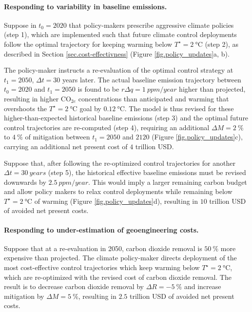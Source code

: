 \documentclass{article}
\begin{document}
\paragraph{Responding to variability in baseline emissions.}
Suppose in $t_{0} = 2020$ that policy-makers prescribe aggressive climate policies (step 1), which are implemented such that future climate control deployments follow the optimal trajectory for keeping warming below $T^{\star} = \SI{2}{\celsius}$ (step 2), as described in Section \ref{sec.cost-effectivness} (Figure \ref{fig.policy_updates}a, b). 

The policy-maker instructs a re-evaluation of the optimal control strategy at $t_{1} = 2050$, $\Delta t = 30$ years later. The actual baseline emission trajectory between $t_{0}=2020$ and $t_{1}=2050$ is found to be $r\Delta q = \SI{1}{ppm/year}$ higher than projected, resulting in higher CO$_{2e}$ concentrations than anticipated and warming that overshoots the $T^{\star} = \SI{2}{\celsius}$ goal by $\SI{0.12}{\celsius}$. The model is thus revised for these higher-than-expected historical baseline emissions (step 3) and the optimal future control trajectories are re-computed (step 4), requiring an additional $\Delta M = \SI{2}{\%}$ to $\SI{4}{\%}$ of mitigation between $t_{1} = 2050$ and $2120$ (Figure \ref{fig.policy_updates}c), carrying an additional net present cost of $4$ trillion USD.

Suppose that, after following the re-optimized control trajectories for another $\Delta t = \SI{30}{years}$ (step 5), the historical effective baseline emissions must be revised downwards by $\SI{2.5}{ppm/year}$. This would imply a larger remaining carbon budget \citep{millar_cumulative_2016} and allow policy makers to relax control deployments while remaining below $T^{\star} = \SI{2}{\celsius}$ of warming (Figure \ref{fig.policy_updates}d), resulting in $10$ trillion USD of avoided net present costs.

\paragraph{Responding to under-estimation of geoengineering costs.}

Suppose that at a re-evaluation in 2050, carbon dioxide removal is $\SI{50}{\%}$ more expensive than projected. The climate policy-maker directs deployment of the most cost-effective control trajectories which keep warming below $T^{\star}=\SI{2}{\celsius}$, which are re-optimized with the revised cost of carbon dioxide removal. The result is to decrease carbon dioxide removal by $\Delta R = \SI{-5}{\%}$ and increase mitigation by $\Delta M = \SI{5}{\%}$, resulting in $2.5$ trillion USD of avoided net present costs.
\end{document}
